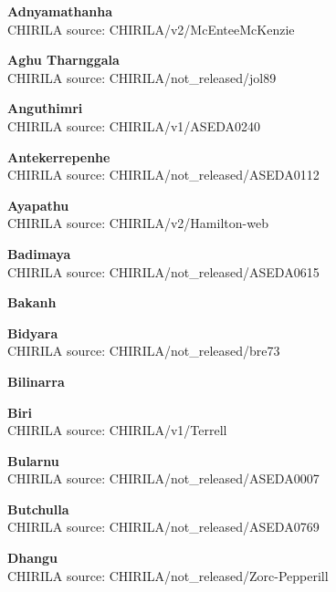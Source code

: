 \textbf{Adnyamathanha}\\
CHIRILA source: CHIRILA/v2/McEnteeMcKenzie


\textbf{Aghu Tharnggala}\\
CHIRILA source: CHIRILA/not\_released/jol89


\textbf{Anguthimri}\\
CHIRILA source: CHIRILA/v1/ASEDA0240


\textbf{Antekerrepenhe}\\
CHIRILA source: CHIRILA/not\_released/ASEDA0112


\textbf{Ayapathu}\\
CHIRILA source: CHIRILA/v2/Hamilton-web


\textbf{Badimaya}\\
CHIRILA source: CHIRILA/not\_released/ASEDA0615


\textbf{Bakanh}\\

\textbf{Bidyara}\\
CHIRILA source: CHIRILA/not\_released/bre73


\textbf{Bilinarra}\\

\textbf{Biri}\\
CHIRILA source: CHIRILA/v1/Terrell


\textbf{Bularnu}\\
CHIRILA source: CHIRILA/not\_released/ASEDA0007


\textbf{Butchulla}\\
CHIRILA source: CHIRILA/not\_released/ASEDA0769


\textbf{Dhangu}\\
CHIRILA source: CHIRILA/not\_released/Zorc-Pepperill

